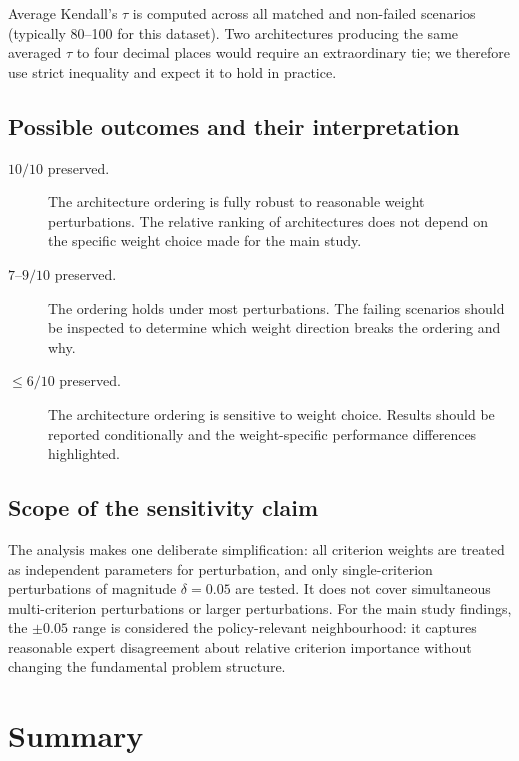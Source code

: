 \documentclass[11pt]{article}
\begin{document}
Average Kendall's $\tau$ is computed across all matched and non-failed scenarios
(typically 80--100 for this dataset).  Two architectures producing the same
averaged $\tau$ to four decimal places would require an extraordinary tie;
we therefore use strict inequality and expect it to hold in practice.

\subsection{Possible outcomes and their interpretation}

\begin{description}
  \item[$10/10$ preserved.]
    The architecture ordering is fully robust to reasonable weight
    perturbations.  The relative ranking of architectures does not depend
    on the specific weight choice made for the main study.
  \item[$7$--$9/10$ preserved.]
    The ordering holds under most perturbations.  The failing scenarios
    should be inspected to determine which weight direction breaks the
    ordering and why.
  \item[$\leq 6/10$ preserved.]
    The architecture ordering is sensitive to weight choice.  Results
    should be reported conditionally and the weight-specific performance
    differences highlighted.
\end{description}

\subsection{Scope of the sensitivity claim}

The analysis makes one deliberate simplification: all criterion weights are
treated as independent parameters for perturbation, and only single-criterion
perturbations of magnitude $\delta = 0.05$ are tested.  It does not cover
simultaneous multi-criterion perturbations or larger perturbations.
For the main study findings, the $\pm 0.05$ range is considered the
policy-relevant neighbourhood: it captures reasonable expert disagreement
about relative criterion importance without changing the fundamental
problem structure.

\section*{Summary}
\end{document}
